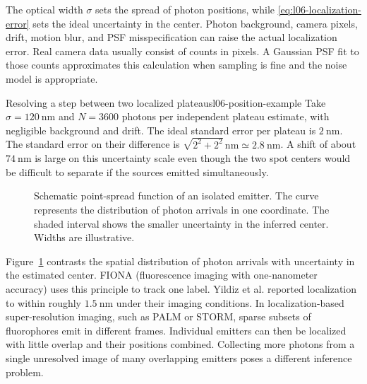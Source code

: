 The optical width $\sigma$ sets the spread of photon positions, while \eqref{eq:l06-localization-error} sets the ideal uncertainty in the center. Photon background, camera pixels, drift, motion blur, and PSF misspecification can raise the actual localization error. Real camera data usually consist of counts in pixels. A Gaussian PSF fit to those counts approximates this calculation when sampling is fine and the noise model is appropriate.

\begin{example}{Resolving a step between two localized plateaus}{l06-position-example}
Take $\sigma=\SI{120}{\nano\metre}$ and $N=3600$ photons per independent plateau estimate, with negligible background and drift. The ideal standard error per plateau is $\SI{2}{\nano\metre}$. The standard error on their difference is $\sqrt{2^2+2^2}\,\mathrm{nm}\simeq\SI{2.8}{\nano\metre}$. A shift of about $\SI{74}{\nano\metre}$ is large on this uncertainty scale even though the two spot centers would be difficult to separate if the sources emitted simultaneously.
\end{example}

\begin{figure}[htbp]
\centering
{}
\caption{Schematic point-spread function of an isolated emitter. The curve represents the distribution of photon arrivals in one coordinate. The shaded interval shows the smaller uncertainty in the inferred center. Widths are illustrative.}
\label{fig:l06-localization}
\end{figure}

Figure~\ref{fig:l06-localization} contrasts the spatial distribution of photon arrivals with uncertainty in the estimated center. FIONA (fluorescence imaging with one-nanometer accuracy) uses this principle to track one label. Yildiz et al. reported localization to within roughly $\SI{1.5}{\nano\metre}$ under their imaging conditions. In localization-based super-resolution imaging, such as PALM or STORM, sparse subsets of fluorophores emit in different frames. Individual emitters can then be localized with little overlap and their positions combined. Collecting more photons from a single unresolved image of many overlapping emitters poses a different inference problem.

